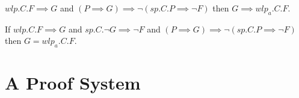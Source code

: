 \begin{lemmabk}
$wlp.C.F\implies G${ and }$(P\implies G) \implies \neg(sp.C.P \implies \neg F)${ then }$G \implies wlp_a.C.F$. 
\end{lemmabk}

\begin{corollarybk} 
{If }$wlp.C.F\implies G${ and }$sp.C.\neg G \implies \neg F$ 
{ and }$(P\implies G) \implies \neg(sp.C.P \implies \neg F)$
{ then }$G = wlp_a.C.F$. 
\end{corollarybk}


















\newpage
\section{A Proof System}





